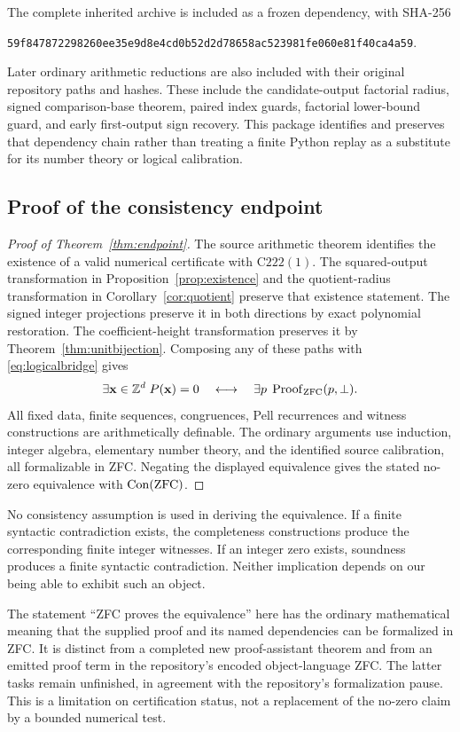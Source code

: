 The complete inherited archive is included as a frozen dependency, with SHA-256
\begin{center}\scriptsize
\texttt{59f847872298260ee35e9d8e4cd0b52d2d78658ac523981fe060e81f40ca4a59}.
\end{center}
Later ordinary arithmetic reductions are also included with their original repository paths and hashes. These include the candidate-output factorial radius, signed comparison-base theorem, paired index guards, factorial lower-bound guard, and early first-output sign recovery. This package identifies and preserves that dependency chain rather than treating a finite Python replay as a substitute for its number theory or logical calibration.

\subsection{Proof of the consistency endpoint}

\begin{proof}[Proof of Theorem~\ref{thm:endpoint}]
The source arithmetic theorem identifies the existence of a valid numerical certificate with \(\mathrm{C222}(1)\). The squared-output transformation in Proposition~\ref{prop:existence} and the quotient-radius transformation in Corollary~\ref{cor:quotient} preserve that existence statement. The signed integer projections preserve it in both directions by exact polynomial restoration. The coefficient-height transformation preserves it by Theorem~\ref{thm:unitbijection}. Composing any of these paths with \eqref{eq:logicalbridge} gives
\[
\exists\mathbf x\in\mathbb Z^d\;P(\mathbf x)=0
\quad\longleftrightarrow\quad
\exists p\;\operatorname{Proof}_{\mathrm{ZFC}}(p,\bot).
\]
All fixed data, finite sequences, congruences, Pell recurrences and witness constructions are arithmetically definable. The ordinary arguments use induction, integer algebra, elementary number theory, and the identified source calibration, all formalizable in ZFC. Negating the displayed equivalence gives the stated no-zero equivalence with \(\operatorname{Con}(\mathrm{ZFC})\).
\end{proof}

No consistency assumption is used in deriving the equivalence. If a finite syntactic contradiction exists, the completeness constructions produce the corresponding finite integer witnesses. If an integer zero exists, soundness produces a finite syntactic contradiction. Neither implication depends on our being able to exhibit such an object.

The statement ``ZFC proves the equivalence'' here has the ordinary mathematical meaning that the supplied proof and its named dependencies can be formalized in ZFC. It is distinct from a completed new proof-assistant theorem and from an emitted proof term in the repository's encoded object-language ZFC. The latter tasks remain unfinished, in agreement with the repository's formalization pause. This is a limitation on certification status, not a replacement of the no-zero claim by a bounded numerical test.
